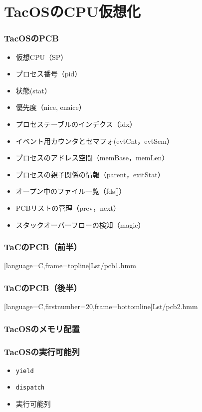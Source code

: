 \documentclass[dvipdfmx]{beamer}
\begin{document}
\section{TacOSのCPU仮想化}
\begin{frame}
  \frametitle{TacOSのPCB}
  \begin{itemize}
    \item 仮想CPU（SP）
    \item プロセス番号（pid）
    \item 状態(stat）
    \item 優先度（nice, enaice）
    \item プロセステーブルのインデクス（idx）
    \item イベント用カウンタとセマフォ(evtCnt，evtSem）
    \item プロセスのアドレス空間（memBase，memLen）
    \item プロセスの親子関係の情報（parent，exitStat）
    \item オープン中のファイル一覧（fds[]）
    \item PCBリストの管理（prev，next）
    \item スタックオーバーフローの検知（magic）
  \end{itemize}
\end{frame}

\begin{frame}[fragile]
  \frametitle{TaCのPCB（前半）}
  
      [language={C},frame=topline]{Lst/pcb1.hmm}
\end{frame}

\begin{frame}[fragile]
  \frametitle{TaCのPCB（後半）}
  
      [language={C},firstnumber=20,frame=bottomline]{Lst/pcb2.hmm}
\end{frame}

\begin{frame}
  \frametitle{TacOSのメモリ配置}
\end{frame}

\begin{frame}
  \frametitle{TacOSの実行可能列}
  \begin{itemize}
    \item {\tt yield}
    \item {\tt dispatch}
    \item 実行可能列
  \end{itemize}
\end{frame}
\end{document}

